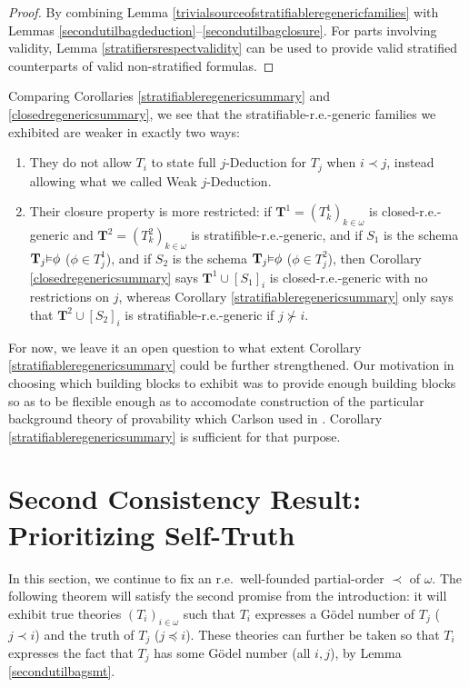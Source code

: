 \documentclass[reqno]{article}
\theoremstyle{definition}
\def\T{\mathbf{T}}
\renewcommand{\Pr}[1]{\T_{#1}\mbox{\small${\vDash}$}}
\begin{document}
\begin{proof}
By combining Lemma \ref{trivialsourceofstratifiableregenericfamilies} with
Lemmas \ref{secondutilbagdeduction}--\ref{secondutilbagclosure}.
For parts involving validity, Lemma \ref{stratifiersrespectvalidity} can be
used to provide valid stratified counterparts of valid non-stratified formulas.
\end{proof}

Comparing Corollaries \ref{stratifiableregenericsummary}
and \ref{closedregenericsummary},
we see that the
stratifiable-r.e.-generic families we exhibited are weaker in exactly two ways:
\begin{enumerate}
    \item They do not
    allow $T_i$ to state full $j$-Deduction for $T_j$ when
    $i\prec j$, instead allowing what we called Weak $j$-Deduction.
    \item Their closure property is more restricted:
    if $\T^1=(T^1_k)_{k\in\omega}$ is closed-r.e.-generic
    and $\T^2=(T^2_k)_{k\in\omega}$ is stratifible-r.e.-generic,
    and if $S_1$ is the schema $\Pr j \phi$ ($\phi\in T^1_j$),
    and if $S_2$ is the schema $\Pr j \phi$ ($\phi\in T^2_j$),
    then Corollary \ref{closedregenericsummary} says
    $\T^1\cup [S_1]_i$ is closed-r.e.-generic with no restrictions on $j$,
    whereas Corollary \ref{stratifiableregenericsummary} only says
    that $\T^2\cup [S_2]_i$ is stratifiable-r.e.-generic if $j\not\succ i$.
\end{enumerate}
For now, we leave it an open question to what
extent Corollary \ref{stratifiableregenericsummary} could be further
strengthened. Our motivation in choosing which building blocks to exhibit was
to provide enough building blocks so as to be flexible enough as to accomodate
construction of the particular background theory of provability which Carlson
used in \cite{carlson2000}. Corollary \ref{stratifiableregenericsummary} is
sufficient for that purpose.

\section[Second Consistency Result: Prioritizing Self-Truth]{Second Consistency Result:\\Prioritizing Self-Truth}

In this section, we continue to fix an r.e.\ well-founded partial-order $\prec$
of $\omega$.
The following theorem will satisfy the second promise from the introduction:
it will exhibit true theories $(T_i)_{i\in\omega}$ such that $T_i$ expresses 
a G\"odel number of $T_j$ ($j\prec i$) and the truth of $T_j$ ($j\preceq 
i$).  These theories can further be taken so that $T_i$ expresses the fact 
that $T_j$ has some G\"odel number (all $i,j$), by Lemma \ref{secondutilbagsmt}.
\end{document}
